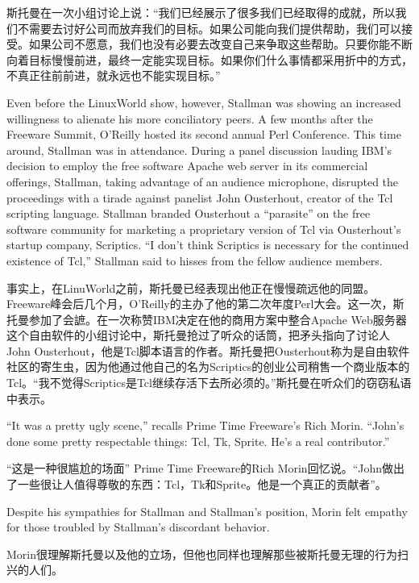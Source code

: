 \ifdefined\chs
斯托曼在一次小组讨论上说：“我们已经展示了很多我们已经取得的成就，所以我们不需要去讨好公司而放弃我们的目标。如果公司能向我们提供帮助，我们可以接受。如果公司不愿意，我们也没有必要去改变自己来争取这些帮助。只要你能不断向着目标慢慢前进，最终一定能实现目标。如果你们什么事情都采用折中的方式，不真正往前前进，就永远也不能实现目标。”
\fi

\ifdefined\eng
Even before the LinuxWorld show, however, Stallman was showing an increased willingness to alienate his more conciliatory peers. A few months after the Freeware Summit, O'Reilly hosted its second annual Perl Conference. This time around, Stallman was in attendance. During a panel discussion lauding IBM's decision to employ the free software Apache web server in its commercial offerings, Stallman, taking advantage of an audience microphone, disrupted the proceedings with a tirade against panelist John Ousterhout, creator of the Tcl scripting language. Stallman branded Ousterhout a ``parasite'' on the free software community for marketing a proprietary version of Tcl via Ousterhout's startup company, Scriptics. ``I don't think Scriptics is necessary for the continued existence of Tcl,'' Stallman said to hisses from the fellow audience members.\endnote{}
\fi

\ifdefined\chs
事实上，在LinuWorld之前，斯托曼已经表现出他正在慢慢疏远他的同盟。Freeware峰会后几个月，O'Reilly的主办了他的第二次年度Perl大会。这一次，斯托曼参加了会謶。在一次称赞IBM决定在他的商用方案中整合Apache Web服务器这个自由软件的小组讨论中，斯托曼抢过了听众的话筒，把矛头指向了讨论人John Ousterhout，他是Tcl脚本语言的作者。斯托曼把Ousterhout称为是自由软件社区的寄生虫，因为他通过他自己的名为Scriptics的创业公司稍售一个商业版本的Tcl。“我不觉得Scriptics是Tcl继续存活下去所必须的。”斯托曼在听众们的窃窃私语中表示。\endnote{}
\fi

\ifdefined\eng
``It was a pretty ugly scene,'' recalls Prime Time Freeware's Rich Morin. ``John's done some pretty respectable things: Tcl, Tk, Sprite. He's a real contributor.''
\fi

\ifdefined\chs
“这是一种很尴尬的场面” Prime Time Freeware的Rich Morin回忆说。“John做出了一些很让人值得尊敬的东西：Tcl，Tk和Sprite。他是一个真正的贡献者”。
\fi

\ifdefined\eng
Despite his sympathies for Stallman and Stallman's position, Morin felt empathy for those troubled by Stallman's discordant behavior.
\fi

\ifdefined\chs
Morin很理解斯托曼以及他的立场，但他也同样也理解那些被斯托曼无理的行为扫兴的人们。
\fi

